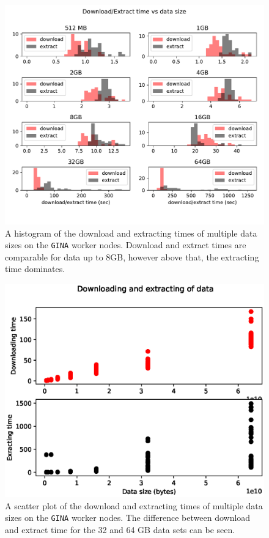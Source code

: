 \documentclass[preprint,5p]{elsarticle}
\begin{document}
\begin{figure}
    \includegraphics[width=0.95\linewidth]{figures/dl_ex.pdf}
      \caption{A histogram of the download and extracting times of multiple data sizes on the \texttt{GINA} worker nodes. Download and extract times are comparable for data up to 8GB, however above that, the extracting time dominates.  }
	\label{fig:dl_hist}
\end{figure}

\begin{figure}
    \includegraphics[width=0.95\linewidth]{figures/download_extract_sct.eps}
      \caption{A scatter plot of the download and extracting times of multiple data sizes on the \texttt{GINA} worker nodes. The difference between download and extract time for the 32 and 64 GB data sets can be seen.  }
	\label{fig:dl_plot}
\end{figure}
\end{document}
